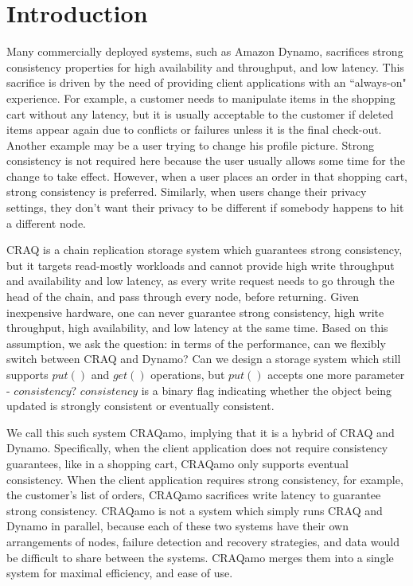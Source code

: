 \section{Introduction}
\label{sec:intro}

Many commercially deployed systems, such as Amazon Dynamo\cite{decandia2007dynamo}, sacrifices strong consistency properties for high availability and throughput, and low latency. This sacrifice is driven by the need of providing client applications with an ``always-on" experience. For example, a customer needs to manipulate items in the shopping cart without any latency, but it is usually acceptable to the customer if deleted items appear again due to conflicts or failures unless it is the final check-out. Another example may be a user trying to change his profile picture. Strong consistency is not required here because the user usually allows some time for the change to take effect. However, when a user places an order in that shopping cart, strong consistency is preferred. Similarly, when users change their privacy settings, they don't want their privacy to be different if somebody happens to hit a different node.

CRAQ\cite{terrace2009object} is a chain replication storage system which guarantees strong consistency, but it targets read-mostly workloads and cannot provide high write throughput and availability and low latency, as every write request needs to go through the head of the chain, and pass through every node, before returning.  Given inexpensive hardware, one can never guarantee strong consistency, high write throughput, high availability, and low latency at the same time. Based on this assumption, we ask the question: in terms of the performance, can we flexibly switch between CRAQ and Dynamo? Can we design a storage system which still supports $put()$ and $get()$ operations, but $put()$ accepts one more parameter - $consistency$? $consistency$ is a binary flag indicating whether the object being updated is strongly consistent or eventually consistent.

We call this such system CRAQamo, implying that it is a hybrid of CRAQ and Dynamo. Specifically, when the client application does not require consistency guarantees, like in a shopping cart, CRAQamo only supports eventual consistency. When the client application requires strong consistency, for example, the customer's list of orders, CRAQamo sacrifices write latency to guarantee strong consistency. CRAQamo is not a system which simply runs CRAQ and Dynamo in parallel, because each of these two systems have their own arrangements of nodes, failure detection and recovery strategies, and data would be difficult to share between the systems. CRAQamo merges them into a single system for maximal efficiency, and ease of use.

